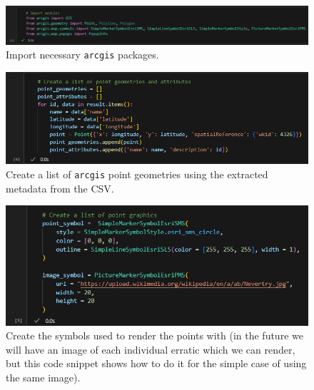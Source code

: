 \documentclass{article}
\begin{document}
\begin{figure}[H]
    \centering
    \includegraphics[width=1.0\textwidth]{Images/CodeSnippet2.png}
    \caption{Import necessary \texttt{arcgis} packages.}
    \label{fig:2}
\end{figure}


\begin{figure}[H]
    \centering
    \includegraphics[width=1.0\textwidth]{Images/CodeSnippet4.png}
    \caption{Create a list of \texttt{arcgis} point geometries using the extracted metadata from the CSV.}
    \label{fig:4}
\end{figure}

\begin{figure}[H]
    \centering
    \includegraphics[width=1.0\textwidth]{Images/CodeSnippet5.png}
    \caption{Create the symbols used to render the points with (in the future we will have an image of each individual erratic which we can render, but this code snippet shows how to do it for the simple case of using the same image).}
    \label{fig:5}
\end{figure}
\end{document}
